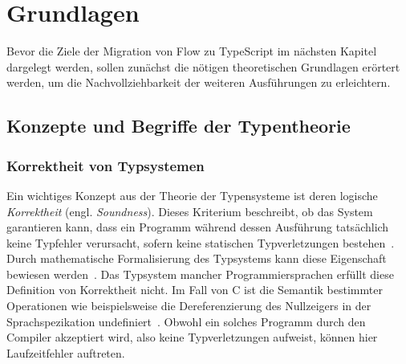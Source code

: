 \chapter{Grundlagen}
\label{chap:basics}

Bevor die Ziele der Migration von Flow zu TypeScript im nächsten Kapitel dargelegt werden, sollen zunächst die nötigen theoretischen Grundlagen erörtert werden, um die Nachvollziehbarkeit der weiteren Ausführungen zu erleichtern.

\section{Konzepte und Begriffe der Typentheorie}

\subsection{Korrektheit von Typsystemen}
Ein wichtiges Konzept aus der Theorie der Typensysteme ist deren logische \emph{Korrektheit} (engl. \emph{Soundness}). Dieses Kriterium beschreibt, ob das System garantieren kann, dass ein Programm während dessen Ausführung tatsächlich keine Typfehler verursacht, sofern keine statischen Typverletzungen bestehen~\autocite{WRIGHT:1994}. Durch mathematische Formalisierung des Typsystems kann diese Eigenschaft bewiesen werden~\autocite[7]{CARDELLI:TYPE_SYSTEMS}.
Das Typsystem mancher Programmiersprachen erfüllt diese Definition von Korrektheit nicht. Im Fall von C ist die Semantik bestimmter Operationen wie beispielsweise die Dereferenzierung des Nullzeigers in der Sprachspezikation undefiniert~\autocite[79]{ISO:C99}. Obwohl ein solches Programm durch den Compiler akzeptiert wird, also keine Typverletzungen aufweist, können hier Laufzeitfehler auftreten.

